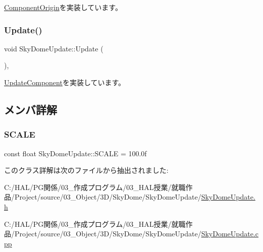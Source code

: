 \mbox{\hyperlink{class_component_origin_a9f89a93f9c1954bd53f9750e35e6089d}{Component\+Origin}}を実装しています。

\mbox{\label{class_sky_dome_update_ae163cb90e4de561fe1f7b2cb311be331}} 
\subsubsection{\texorpdfstring{Update()}{Update()}}
{\footnotesize\ttfamily void Sky\+Dome\+Update\+::\+Update (\begin{DoxyParamCaption}{ }\end{DoxyParamCaption})\hspace{0.3cm}{\ttfamily [override]}, {\ttfamily [virtual]}}



\mbox{\hyperlink{class_update_component_ade313ad8bf19a81e7d098aa830d9f01b}{Update\+Component}}を実装しています。



\subsection{メンバ詳解}
\mbox{\label{class_sky_dome_update_a4c6750a54880db753cfe2a4ecfd24130}} 
\subsubsection{\texorpdfstring{S\+C\+A\+LE}{SCALE}}
{\footnotesize\ttfamily const float Sky\+Dome\+Update\+::\+S\+C\+A\+LE = 100.\+0f\hspace{0.3cm}{\ttfamily [static]}}



このクラス詳解は次のファイルから抽出されました\+:\begin{DoxyCompactItemize}
\item 
C\+:/\+H\+A\+L/\+P\+G関係/03\+\_\+作成プログラム/03\+\_\+\+H\+A\+L授業/就職作品/\+Project/source/03\+\_\+\+Object/3\+D/\+Sky\+Dome/\+Sky\+Dome\+Update/\mbox{\hyperlink{_sky_dome_update_8h}{Sky\+Dome\+Update.\+h}}\item 
C\+:/\+H\+A\+L/\+P\+G関係/03\+\_\+作成プログラム/03\+\_\+\+H\+A\+L授業/就職作品/\+Project/source/03\+\_\+\+Object/3\+D/\+Sky\+Dome/\+Sky\+Dome\+Update/\mbox{\hyperlink{_sky_dome_update_8cpp}{Sky\+Dome\+Update.\+cpp}}\end{DoxyCompactItemize}

